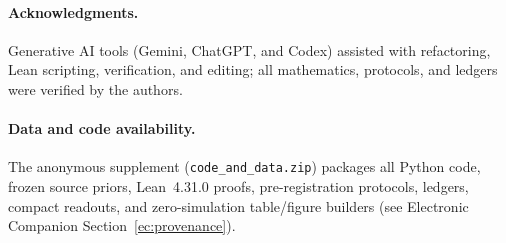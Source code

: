 \documentclass[opre,dblanonrev]{informs4}
\begin{document}
\maketitle










\paragraph{Acknowledgments.}
Generative AI tools (Gemini, ChatGPT, and Codex) assisted with refactoring, Lean scripting, verification, and editing; all mathematics, protocols, and ledgers were verified by the authors.

\paragraph{Data and code availability.}
The anonymous supplement (\texttt{code\_and\_data.zip}) packages all Python code, frozen source priors, Lean~4.31.0 proofs, pre-registration protocols, ledgers, compact readouts, and zero-simulation table/figure builders (see Electronic Companion Section~\ref*{ec:provenance}).

\clearpage



\clearpage

\end{document}
